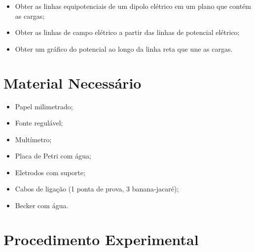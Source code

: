 \begin{itemize}
	\item Obter as linhas equipotenciais de um dipolo elétrico em um plano que contém as cargas;
	\item Obter as linhas de campo elétrico a partir das linhas de potencial elétrico;
	\item Obter um gráfico do potencial ao longo da linha reta que une as cargas.
\end{itemize}

\section{Material Necessário}

\begin{itemize}
	\item Papel milimetrado;
	\item Fonte regulável;
	\item Multímetro;
	\item Placa de Petri com água;
	\item Eletrodos com suporte;
	\item Cabos de ligação (1 ponta de prova, 3 banana-jacaré);
	\item Becker com água.
\end{itemize}

\section{Procedimento Experimental}

